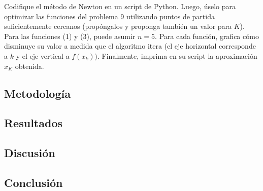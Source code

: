 \documentclass{article}
\begin{document}
Codifique el método de Newton en un script de Python. Luego, úselo para optimizar las funciones del problema 9 utilizando puntos de partida suficientemente cercanos (propóngalos y proponga también un valor para $K$). Para las funciones (1) y (3), puede asumir $n = 5$. Para cada función, grafica cómo disminuye su valor a medida que el algoritmo itera (el eje horizontal corresponde a $k$ y el eje vertical a $f(x_k))$. Finalmente, imprima en su script la aproximación $x_K$ obtenida.

\subsection{Metodología}

\subsection{Resultados}
\setcounter{equation}{0}

\subsection{Discusión}

\subsection{Conclusión}
\end{document}
